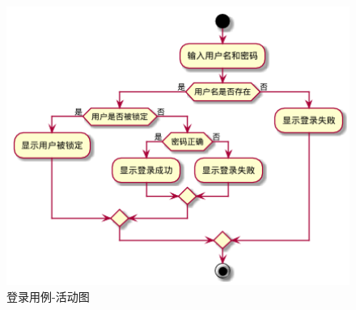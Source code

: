    \begin{figure}[htp]
        \centering
        \includegraphics[width=12cm]{figure/usecase/uc_sub/uc_login.png}
        \caption{登录用例-活动图}
        \label{fig:logon-uml}
    \end{figure}
    

